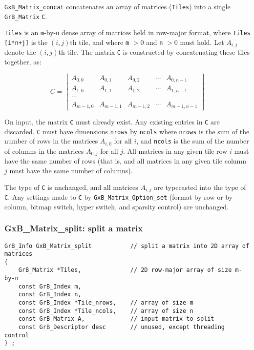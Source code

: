 \documentclass[12pt]{article}
\begin{document}
{\verb'GxB_Matrix_concat' concatenates an array of matrices (\verb'Tiles') into
a single \verb'GrB_Matrix' \verb'C'.

\verb'Tiles' is an \verb'm'-by-\verb'n' dense array of matrices held in
row-major format, where \verb'Tiles [i*n+j]' is the $(i,j)$th tile, and where
\verb'm' $> 0$ and \verb'n' $> 0$ must hold.  Let $A_{i,j}$ denote the
$(i,j)$th tile.  The matrix \verb'C' is constructed by concatenating these
tiles together, as:

\[
C = 
\left[
\begin{array}{ccccc}
          A_{0,0}   & A_{0,1}   & A_{0,2}   & \cdots & A_{0,n-1}   \\
          A_{1,0}   & A_{1,1}   & A_{1,2}   & \cdots & A_{1,n-1}   \\
          \cdots    &                                              \\
          A_{m-1,0} & A_{m-1,1} & A_{m-1,2} & \cdots & A_{m-1,n-1}
\end{array}
\right]
\]

On input, the matrix \verb'C' must already exist.  Any existing entries in
\verb'C' are discarded.  \verb'C' must have dimensions \verb'nrows' by
\verb'ncols' where \verb'nrows' is the sum of the number of rows in the
matrices $A_{i,0}$ for all $i$, and \verb'ncols' is the sum of the number of
columns in the matrices $A_{0,j}$ for all $j$.  All matrices in any given tile
row $i$ must have the same number of rows (that is, and all matrices in any
given tile column $j$ must have the same number of columns).

The type of \verb'C' is unchanged, and all matrices $A_{i,j}$ are typecasted
into the type of \verb'C'.  Any settings made to \verb'C' by
\verb'GxB_Matrix_Option_set' (format by row or by column, bitmap switch, hyper
switch, and sparsity control) are unchanged.

\newpage
\subsubsection{{\sf GxB\_Matrix\_split:} split a matrix   }
\label{matrix_split}

\begin{mdframed}[userdefinedwidth=6in]
{\footnotesize
\begin{verbatim}
GrB_Info GxB_Matrix_split           // split a matrix into 2D array of matrices
(
    GrB_Matrix *Tiles,              // 2D row-major array of size m-by-n
    const GrB_Index m,
    const GrB_Index n,
    const GrB_Index *Tile_nrows,    // array of size m
    const GrB_Index *Tile_ncols,    // array of size n
    const GrB_Matrix A,             // input matrix to split
    const GrB_Descriptor desc       // unused, except threading control
) ;
\end{verbatim} } \end{mdframed}

}
\end{document}
